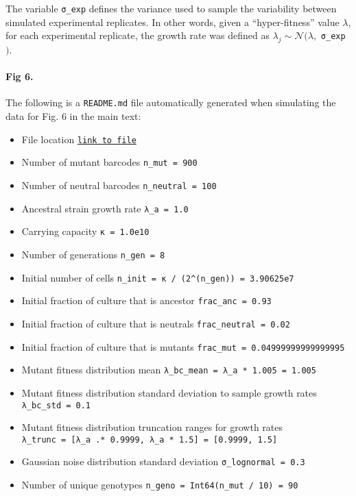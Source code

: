 \documentclass[
]{scrartcl}
\let\oldparagraph\paragraph
\renewcommand{\paragraph}[1]{\oldparagraph{#1}\mbox{}}
\providecommand{\tightlist}{%
  \setlength{\itemsep}{0pt}\setlength{\parskip}{0pt}}\usepackage{longtable,booktabs,array}
\begin{document}
\begin{refsegment}
The variable \texttt{σ\_exp} defines the variance used to sample the
variability between simulated experimental replicates. In other words,
given a ``hyper-fitness'' value \(\lambda\), for each experimental
replicate, the growth rate was defined as
\(\lambda_j \sim \mathcal{N}(\lambda,\) \texttt{σ\_exp} \()\).

\hypertarget{fig-6.}{%
\paragraph{Fig 6.}\label{fig-6.}}

The following is a \texttt{README.md} file automatically generated when
simulating the data for Fig. 6 in the main text:

\begin{itemize}
\tightlist
\item
  File location
  \href{https://github.com/mrazomej/bayesian_fitness/blob/master/code/processing/data007_logistic_hierarchicalgenotype_1000bc_01env_01rep/sim_data007.jl}{\texttt{link\ to\ file}}
\item
  Number of mutant barcodes \texttt{n\_mut\ =\ 900}
\item
  Number of neutral barcodes \texttt{n\_neutral\ =\ 100}
\item
  Ancestral strain growth rate \texttt{λ\_a\ =\ 1.0}
\item
  Carrying capacity \texttt{κ\ =\ 1.0e10}
\item
  Number of generations \texttt{n\_gen\ =\ 8}
\item
  Initial number of cells
  \texttt{n\_init\ =\ κ\ /\ (2\^{}(n\_gen))\ =\ 3.90625e7}
\item
  Initial fraction of culture that is ancestor
  \texttt{frac\_anc\ =\ 0.93}
\item
  Initial fraction of culture that is neutrals
  \texttt{frac\_neutral\ =\ 0.02}
\item
  Initial fraction of culture that is mutants
  \texttt{frac\_mut\ =\ 0.04999999999999995}
\item
  Mutant fitness distribution mean
  \texttt{λ\_bc\_mean\ =\ λ\_a\ *\ 1.005\ =\ 1.005}
\item
  Mutant fitness distribution standard deviation to sample growth rates
  \texttt{λ\_bc\_std\ =\ 0.1}
\item
  Mutant fitness distribution truncation ranges for growth rates
  \texttt{λ\_trunc\ =\ {[}λ\_a\ .*\ 0.9999,\ λ\_a\ *\ 1.5{]}\ =\ {[}0.9999,\ 1.5{]}}
\item
  Gaussian noise distribution standard deviation
  \texttt{σ\_lognormal\ =\ 0.3}
\item
  Number of unique genotypes
  \texttt{n\_geno\ =\ Int64(n\_mut\ /\ 10)\ =\ 90}
\end{itemize}


\end{refsegment}
\end{document}
